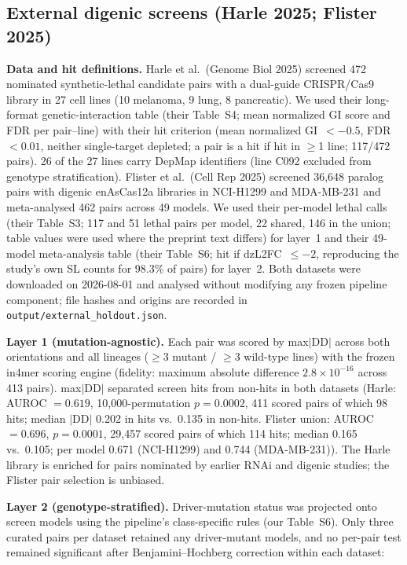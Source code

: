 \documentclass[11pt,a4paper]{article}
\begin{document}
\subsection{External digenic screens (Harle 2025; Flister 2025)}
\textbf{Data and hit definitions.} Harle et al.\ (Genome Biol 2025) screened 472 nominated synthetic-lethal candidate pairs with a dual-guide CRISPR/Cas9 library in 27 cell lines (10 melanoma, 9 lung, 8 pancreatic). We used their long-format genetic-interaction table (their Table~S4; mean normalized GI score and FDR per pair--line) with their hit criterion (mean normalized GI~$<-0.5$, FDR~$<0.01$, neither single-target depleted; a pair is a hit if hit in $\ge$1 line; 117/472 pairs). 26 of the 27 lines carry DepMap identifiers (line C092 excluded from genotype stratification). Flister et al.\ (Cell Rep 2025) screened 36{,}648 paralog pairs with digenic enAsCas12a libraries in NCI-H1299 and MDA-MB-231 and meta-analysed 462 pairs across 49 models. We used their per-model lethal calls (their Table~S3; 117 and 51 lethal pairs per model, 22 shared, 146 in the union; table values were used where the preprint text differs) for layer~1 and their 49-model meta-analysis table (their Table~S6; hit if dzL2FC~$\le-2$, reproducing the study's own SL counts for 98.3\% of pairs) for layer~2. Both datasets were downloaded on 2026-08-01 and analysed without modifying any frozen pipeline component; file hashes and origins are recorded in \texttt{output/external\_holdout.json}.

\textbf{Layer 1 (mutation-agnostic).} Each pair was scored by max$|$DD$|$ across both orientations and all lineages ($\ge$3 mutant / $\ge$3 wild-type lines) with the frozen in4mer scoring engine (fidelity: maximum absolute difference $2.8\times10^{-16}$ across 413 pairs). max$|$DD$|$ separated screen hits from non-hits in both datasets (Harle: AUROC $=0.619$, 10{,}000-permutation $p=0.0002$, 411 scored pairs of which 98 hits; median $|$DD$|$ 0.202 in hits vs.\ 0.135 in non-hits. Flister union: AUROC $=0.696$, $p=0.0001$, 29{,}457 scored pairs of which 114 hits; median 0.165 vs.\ 0.105; per model 0.671 (NCI-H1299) and 0.744 (MDA-MB-231)). The Harle library is enriched for pairs nominated by earlier RNAi and digenic studies; the Flister pair selection is unbiased.

\textbf{Layer 2 (genotype-stratified).} Driver-mutation status was projected onto screen models using the pipeline's class-specific rules (our Table~S6). Only three curated pairs per dataset retained any driver-mutant models, and no per-pair test remained significant after Benjamini--Hochberg correction within each dataset:
\end{document}
